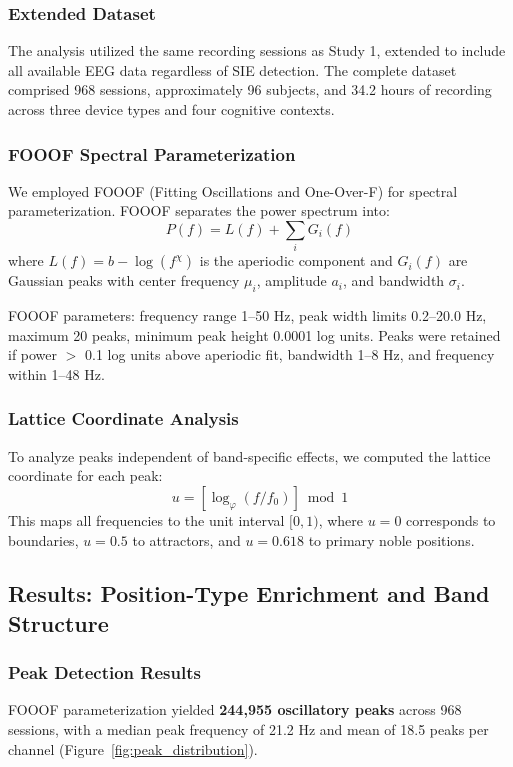 \documentclass[11pt,a4paper]{article}
\newcommand{\phisym}{\varphi}
\begin{document}
\subsubsection{Extended Dataset}
The analysis utilized the same recording sessions as Study 1, extended to include all available EEG data regardless of SIE detection. The complete dataset comprised 968 sessions, approximately 96 subjects, and 34.2 hours of recording across three device types and four cognitive contexts.

\subsubsection{FOOOF Spectral Parameterization}
We employed FOOOF (Fitting Oscillations and One-Over-F) \parencite{donoghue2020fooof} for spectral parameterization. FOOOF separates the power spectrum into:
\begin{equation}
P(f) = L(f) + \sum_{i} G_i(f)
\end{equation}
where $L(f) = b - \log(f^\chi)$ is the aperiodic component and $G_i(f)$ are Gaussian peaks with center frequency $\mu_i$, amplitude $a_i$, and bandwidth $\sigma_i$.

FOOOF parameters: frequency range 1--50 Hz, peak width limits 0.2--20.0 Hz, maximum 20 peaks, minimum peak height 0.0001 log units. Peaks were retained if power $>$ 0.1 log units above aperiodic fit, bandwidth 1--8 Hz, and frequency within 1--48 Hz.

\subsubsection{Lattice Coordinate Analysis}
To analyze peaks independent of band-specific effects, we computed the lattice coordinate for each peak:
\begin{equation}
u = \left[\log_\phisym(f/f_0)\right] \bmod 1
\end{equation}
This maps all frequencies to the unit interval $[0, 1)$, where $u = 0$ corresponds to boundaries, $u = 0.5$ to attractors, and $u = 0.618$ to primary noble positions.

\subsection{Results: Position-Type Enrichment and Band Structure}

\subsubsection{Peak Detection Results}
FOOOF parameterization yielded \textbf{244,955 oscillatory peaks} across 968 sessions, with a median peak frequency of 21.2 Hz and mean of 18.5 peaks per channel (Figure~\ref{fig:peak_distribution}).
\end{document}
